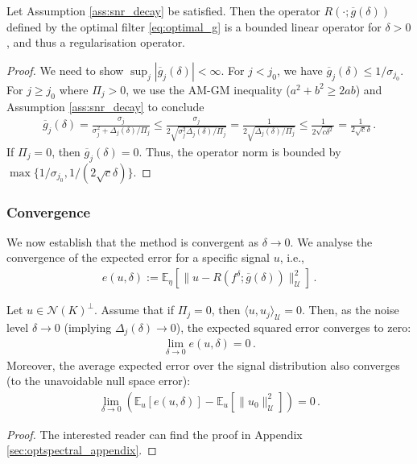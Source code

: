 \begin{lem}\label{lem:learned_bounded}
Let Assumption \ref{ass:snr_decay} be satisfied. Then the operator $R(\cdot; \overline{g}(\delta))$ defined by the optimal filter \eqref{eq:optimal_g} is a bounded linear operator for $\delta > 0$, and thus a regularisation operator.
\end{lem}
\begin{proof}
We need to show $\sup_j |\overline{g}_j(\delta)| < \infty$. For $j < j_0$, we have $\overline{g}_j(\delta) \leq 1/\sigma_{j_0}$. For $j \geq j_0$ where $\Pi_j > 0$, we use the AM-GM inequality ($a^2+b^2 \geq 2ab$) and Assumption \ref{ass:snr_decay} to conclude
\begin{align*}
\overline{g}_j(\delta) = \frac{\sigma_j}{\sigma_j^2 + \Delta_j(\delta)/\Pi_j} \leq \frac{\sigma_j}{2\sqrt{\sigma_j^2 \Delta_j(\delta)/\Pi_j}} = \frac{1}{2\sqrt{\Delta_j(\delta)/\Pi_j}} \leq \frac{1}{2\sqrt{c\delta^2}} = \frac{1}{2\sqrt{c}\delta} \, .
\end{align*}
If $\Pi_j = 0$, then $\overline{g}_j(\delta) = 0$. Thus, the operator norm is bounded by $\max\{1/\sigma_{j_0}, 1/(2\sqrt{c}\delta)\}$.
\end{proof}

\subsubsection{Convergence}

We now establish that the method is convergent as $\delta \to 0$. We analyse the convergence of the expected error for a specific signal $u$, i.e.,
\begin{align*}
e(u, \delta) := \mathbb{E}_\eta\left[ \| u - R(f^\delta; \overline{g}(\delta)) \|_{\mathcal{U}}^2 \right] \, .
\end{align*}

\begin{thm}\label{thm:learned_convergence}
Let $u \in \mathcal{N}(K)^\perp$. Assume that if $\Pi_j=0$, then $\langle u, u_j \rangle_{\mathcal{U}}=0$. Then, as the noise level $\delta \to 0$ (implying $\Delta_j(\delta) \to 0$), the expected squared error converges to zero:
\begin{align*}
\lim_{\delta \to 0} e(u, \delta) = 0 \, .
\end{align*}
Moreover, the average expected error over the signal distribution also converges (to the unavoidable null space error):
\begin{align*}
\lim_{\delta \to 0} \left( \mathbb{E}_{u}[e(u, \delta)] - \mathbb{E}_u[\|u_0\|_{\mathcal{U}}^2] \right) = 0 \, .
\end{align*}
\end{thm}
\begin{proof}
The interested reader can find the proof in Appendix \ref{sec:optspectral_appendix}.
\end{proof}

